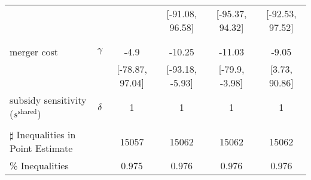\begin{tabular}{@{\extracolsep{5pt}}lccccc}
 &  &  & [-91.08, 96.58] & [-95.37, 94.32] & [-92.53, 97.52] \\
 &  &  &  &  &  \\
 &  &  &  &  &  \\
merger cost & $\gamma$ & -4.9 & -10.25 & -11.03 & -9.05 \\
 &  & [-78.87, 97.04] & [-93.18, -5.93] & [-79.9, -3.98] & [3.73, 90.86] \\
subsidy sensitivity ($s^{\text{shared}}$) & $\delta$ & 1 & 1 & 1 & 1 \\
 &  &  &  &  &  \\
\hline 
$\sharp$ Inequalities in Point Estimate &  & 15057 & 15062 & 15062 & 15062 \\
\% Inequalities &  & 0.975 & 0.976 & 0.976 & 0.976 \\
\bottomrule 
\end{tabular}
